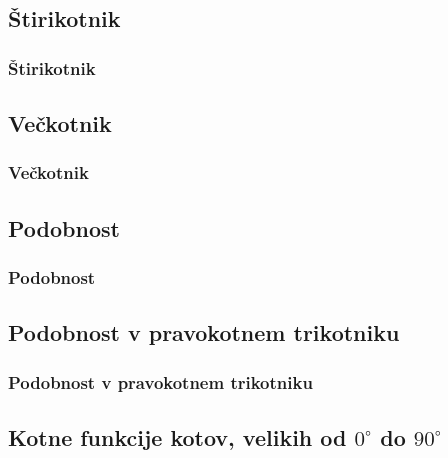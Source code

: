 \begin{frame}
\begin{columns}
\begin{figure}
                            
                    \end{figure}
            \end{columns}
           



        \end{frame}

    \subsection{Štirikotnik}

        \begin{frame}
            \frametitle{Štirikotnik}
        \end{frame}

    \subsection{Večkotnik}

        \begin{frame}
            \frametitle{Večkotnik}
        \end{frame}

    \subsection{Podobnost}

        \begin{frame}
            \frametitle{Podobnost}
        \end{frame}

    \subsection{Podobnost v pravokotnem trikotniku}
        
        \begin{frame}
            \frametitle{Podobnost v pravokotnem trikotniku}
        \end{frame}

    \subsection{Kotne funkcije kotov, velikih od $0^\circ$ do $90^\circ$}
        
